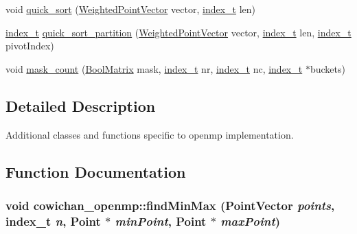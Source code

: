 \begin{CompactItemize}
\item 
void \hyperlink{namespacecowichan__openmp_64208258cab6e46db879b46b40581134}{quick\_\-sort} (\hyperlink{class_weighted_point}{WeightedPointVector} vector, \hyperlink{cowichan_8hpp_5b04577d5d21124855deaad298595371}{index\_\-t} len)
\item 
\hyperlink{cowichan_8hpp_5b04577d5d21124855deaad298595371}{index\_\-t} \hyperlink{namespacecowichan__openmp_2733c307de545e237e020a1f166850c5}{quick\_\-sort\_\-partition} (\hyperlink{class_weighted_point}{WeightedPointVector} vector, \hyperlink{cowichan_8hpp_5b04577d5d21124855deaad298595371}{index\_\-t} len, \hyperlink{cowichan_8hpp_5b04577d5d21124855deaad298595371}{index\_\-t} pivotIndex)
\item 
void \hyperlink{namespacecowichan__openmp_9c68e88badede2262dd4ded923e804dc}{mask\_\-count} (\hyperlink{cowichan_8hpp_a64c8df2f1e9c8ea68a7bcc19aca683e}{BoolMatrix} mask, \hyperlink{cowichan_8hpp_5b04577d5d21124855deaad298595371}{index\_\-t} nr, \hyperlink{cowichan_8hpp_5b04577d5d21124855deaad298595371}{index\_\-t} nc, \hyperlink{cowichan_8hpp_5b04577d5d21124855deaad298595371}{index\_\-t} $\ast$buckets)
\end{CompactItemize}


\subsection{Detailed Description}
Additional classes and functions specific to openmp implementation. 



\subsection{Function Documentation}
\hypertarget{namespacecowichan__openmp_e96598e37e2b937c861c5bc93eda77b8}{
\subsubsection[{findMinMax}]{\setlength{\rightskip}{0pt plus 5cm}void cowichan\_\-openmp::findMinMax ({\bf PointVector} {\em points}, \/  {\bf index\_\-t} {\em n}, \/  {\bf Point} $\ast$ {\em minPoint}, \/  {\bf Point} $\ast$ {\em maxPoint})}}
\label{namespacecowichan__openmp_e96598e37e2b937c861c5bc93eda77b8}


